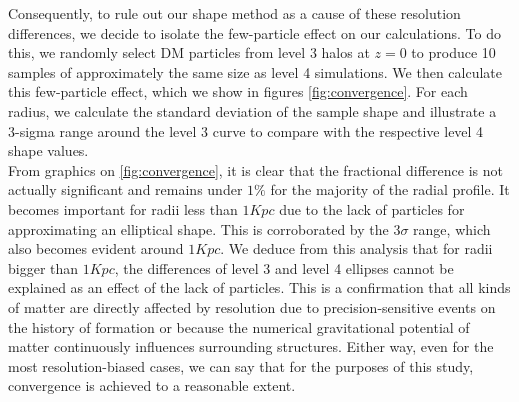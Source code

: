 Consequently, to rule out our shape method as a cause of these resolution differences, we decide to isolate the few-particle effect on our calculations. To do this, we randomly select DM particles from level 3 halos at $z=0$ to produce 10 samples of approximately the same size as level 4 simulations. We then calculate this few-particle effect, which we show in figures \ref{fig:convergence}. For each radius, we calculate the standard deviation of the sample shape and illustrate a 3-sigma range around the level 3 curve to compare with the respective level 4 shape values.\\  

From graphics on \ref{fig:convergence}, it is clear that the fractional difference is not actually significant and remains under $1\%$ for the majority of the radial profile. It becomes important for radii less than $1Kpc$ due to the lack of particles for approximating an elliptical shape. This is corroborated by the $3\sigma$ range, which also becomes evident around $1Kpc$. We deduce from this analysis that for radii bigger than $1Kpc$, the differences of level 3 and level 4 ellipses cannot be explained as an effect of the lack of particles. This is a confirmation that all kinds of matter are directly affected by resolution due to precision-sensitive events on the history of formation or because the numerical gravitational potential of matter continuously influences surrounding structures. Either way, even for the most resolution-biased cases, we can say that for the purposes of this study, convergence is achieved to a reasonable extent.\\  

